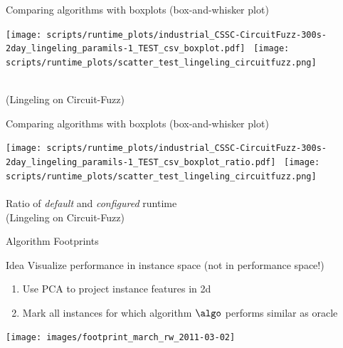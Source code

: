 \begin{frame}[c]{Comparing algorithms with boxplots (box-and-whisker plot)}

\vspace*{-0.5cm}
\begin{center}
\texttt{[image: scripts/runtime\_plots/industrial\_CSSC-CircuitFuzz-300s-2day\_lingeling\_paramils-1\_TEST\_csv\_boxplot.pdf]}~
\texttt{[image: scripts/runtime\_plots/scatter\_test\_lingeling\_circuitfuzz.png]}\\~\\
\vspace*{-0.3cm}

(Lingeling on Circuit-Fuzz)
\end{center}

\end{frame}


\begin{frame}[c]{Comparing algorithms with boxplots (box-and-whisker plot)}

\vspace*{-0.5cm}
\begin{center}
\texttt{[image: scripts/runtime\_plots/industrial\_CSSC-CircuitFuzz-300s-2day\_lingeling\_paramils-1\_TEST\_csv\_boxplot\_ratio.pdf]}~
\texttt{[image: scripts/runtime\_plots/scatter\_test\_lingeling\_circuitfuzz.png]}\\~\\
\vspace*{-0.3cm}
\alert{Ratio} of \emph{default} and \emph{configured} runtime\\
(Lingeling on Circuit-Fuzz)
\end{center}

\end{frame}


\begin{frame}[c]{Algorithm Footprints~}

\begin{block}{Idea}
Visualize performance in instance space (not in performance space!)
\begin{enumerate}
  \item Use PCA to project instance features in 2d
  \item Mark all instances for which algorithm $\algo$ performs similar as oracle
\end{enumerate}
\end{block}

\begin{center}
\texttt{[image: images/footprint\_march\_rw\_2011-03-02]}
\end{center}

\end{frame}




